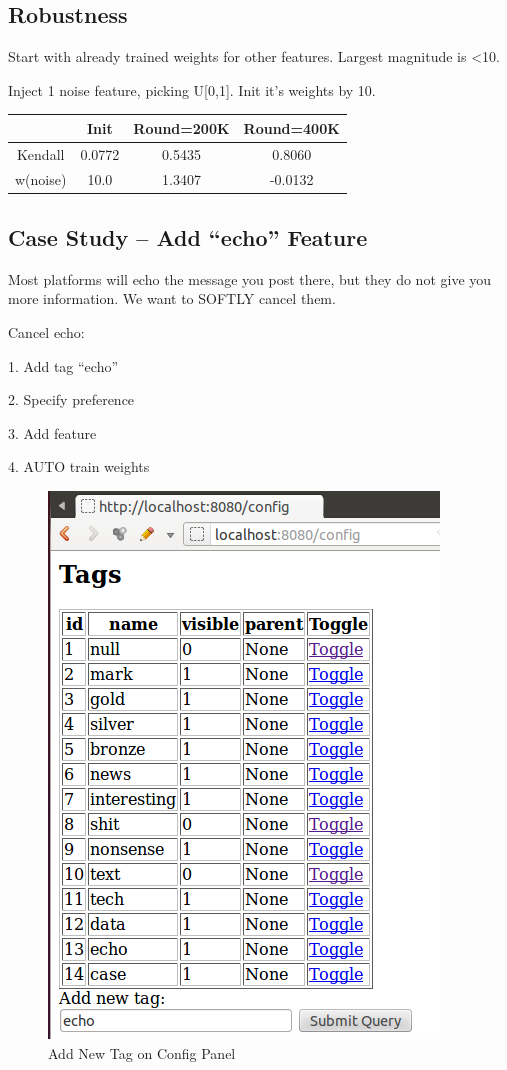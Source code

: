\documentclass{sig-alternate}
\begin{document}
\subsection{Robustness}
\label{sec:Robustness}

Start with already trained weights for
other features. Largest magnitude is <10.

Inject 1 noise feature, picking U[0,1]. Init
it’s weights by 10.

\begin{table}
	\begin{tabular}{|c|c|c|c|}
		\hline 
		& Init & Round=200K & Round=400K \\
		\hline 
Kendall & 0.0772 & 0.5435 & 0.8060 \\
 w(noise) & 10.0 & 1.3407 & -0.0132 \\
		\hline
	\end{tabular}
\end{table}

\subsection{Case Study -- Add ``echo'' Feature}
\label{sec:Case Study -- Add ``echo'' Feature}

Most platforms will echo the
message you post there, but they
do not give you more information.
We want to SOFTLY cancel them.

Cancel echo:

1. Add tag ``echo''

2. Specify preference

3. Add feature

4. AUTO train weights

\begin{figure}[h!]
	\centering
	\includegraphics[width=0.7\linewidth]{../pic/echo_add_tag.png}
	\caption{Add New Tag on Config Panel}
\end{figure}
\end{document}
